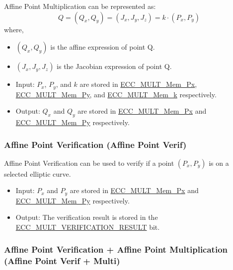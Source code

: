 \documentclass[main\_\_EN.tex]{subfiles}
\begin{document}
Affine Point Multiplication can be represented as:
\[
Q = (Q_x,Q_y) = (J_x,J_y,J_z) = k \cdot (P_x,P_y)
\]
where,
\begin{itemize}
    \item $(Q_x,Q_y)$ is the affine expression of point Q.
    \item $(J_x,J_y,J_z)$ is the Jacobian expression of point Q.
    \item Input: $P_x$, $P_y$, and $k$  are stored in \hyperref[tab:ecc-memory]{ECC\_MULT\_Mem\_Px}, \hyperref[tab:ecc-memory]{ECC\_MULT\_Mem\_Py}, and \hyperref[tab:ecc-memory]{ECC\_MULT\_Mem\_k} respectively.
    \item Output: $Q_x$ and $Q_y$ are stored in \hyperref[tab:ecc-memory]{ECC\_MULT\_Mem\_Px} and \hyperref[tab:ecc-memory]{ECC\_MULT\_Mem\_Py} respectively.
\end{itemize}

\subsubsection{Affine Point Verification (Affine Point Verif)}

Affine Point Verification can be used to verify if a point  $(P_x,P_y)$ is on a selected elliptic curve.

\begin{itemize}
    \item Input: $P_x$ and $P_y$ are stored in \hyperref[tab:ecc-memory]{ECC\_MULT\_Mem\_Px} and \hyperref[tab:ecc-memory]{ECC\_MULT\_Mem\_Py} respectively.
    \item Output: The verification result is stored in the \hyperref[fielddesc:ECCMULTVERIFICATIONRESULT]{ECC\_MULT\_VERIFICATION\_RESULT} bit.
\end{itemize}

\subsubsection{Affine Point Verification + Affine Point Multiplication (Affine Point Verif + Multi)}
\end{document}
